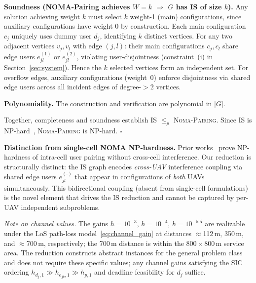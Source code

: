 \documentclass[journal]{IEEEtran}
\begin{document}
\textbf{Soundness (NOMA-Pairing achieves $W\!=\!k$ $\Rightarrow$ $G$ has IS of size $k$).}
Any solution achieving weight $k$ must select $k$ weight-1 (main) configurations, since auxiliary configurations have weight 0 by construction.
Each main configuration $c_j$ uniquely uses dummy user $d_j$, identifying $k$ distinct vertices.
For any two adjacent vertices $v_j, v_l$ with edge $(j,l)$: their main configurations $c_j, c_l$ share edge users $e_{jl}^{(1)}$ or $e_{jl}^{(2)}$, violating user-disjointness (constraint~(i) in Section~\ref{sec:system}).
Hence the $k$ selected vertices form an independent set.
For overflow edges, auxiliary configurations (weight~0) enforce disjointness via shared edge users across all incident edges of degree-$>$2 vertices.

\textbf{Polynomiality.}
The construction and verification are polynomial in $|G|$.

\noindent Together, completeness and soundness establish IS $\leq_p$ \textsc{Noma-Pairing}.
Since IS is NP-hard~\cite{karp1972reducibility,garey1979computers}, \textsc{Noma-Pairing} is NP-hard. \hfill $\square$

\smallskip
\noindent\textbf{Distinction from single-cell NOMA NP-hardness.}
Prior works~\cite{ali2016dynamic,di2017sub} prove NP-hardness of intra-cell user pairing without cross-cell interference.
Our reduction is structurally distinct: the IS graph encodes \emph{cross-UAV} interference coupling via shared edge users $e_{jl}^{(\cdot)}$ that appear in configurations of \emph{both} UAVs simultaneously.
This bidirectional coupling (absent from single-cell formulations) is the novel element that drives the IS reduction and cannot be captured by per-UAV independent subproblems.

\emph{Note on channel values.} The gains $h\!=\!10^{-3}$, $h\!=\!10^{-4}$, $h\!=\!10^{-5.5}$ are realizable under the LoS path-loss model~\eqref{eq:channel_gain} at distances $\approx$112\,m, 350\,m, and $\approx$700\,m, respectively; the 700\,m distance is within the $800\!\times\!800$\,m service area. The reduction constructs abstract instances for the general problem class and does not require these specific values; any channel gains satisfying the SIC ordering $h_{d_j,1} \gg h_{e_{jk},1} \gg h_{p,1}$ and deadline feasibility for $d_j$ suffice.
\end{document}
